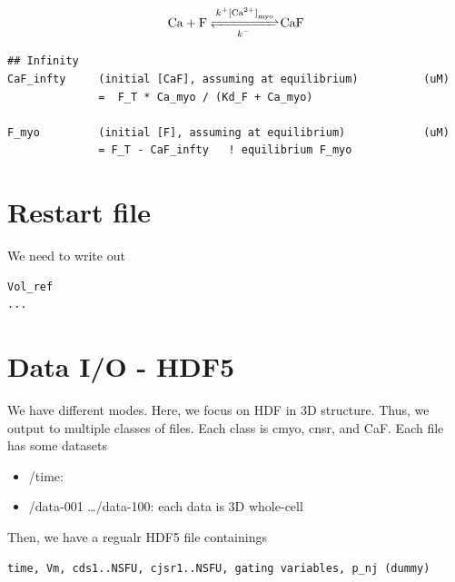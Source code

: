 \begin{equation}
  \label{eq:40}
  \cee{Ca + F <=>[k^+\text{[}\Ca\text{]}_\myo][k^-] CaF}
\end{equation}

\begin{verbatim}
## Infinity
CaF_infty     (initial [CaF], assuming at equilibrium)          (uM)
              =  F_T * Ca_myo / (Kd_F + Ca_myo)

F_myo         (initial [F], assuming at equilibrium)            (uM)
              = F_T - CaF_infty   ! equilibrium F_myo
\end{verbatim}



\section{Restart file}
\label{sec:spatial_restart-file}

We need to write out
\begin{verbatim}
Vol_ref
...
\end{verbatim}



\section{Data I/O - HDF5}
\label{sec:spatial_hdf5}

We have different modes. Here, we focus on HDF in 3D structure. Thus, we output
to multiple classes of files. Each class is cmyo, cnsr, and CaF. Each file has
some datasets
\begin{itemize}	
  \item /time: 
  \item /data-001 \ldots /data-100: each data is 3D whole-cell
\end{itemize}

Then, we have a regualr HDF5 file containings 
\begin{verbatim}
time, Vm, cds1..NSFU, cjsr1..NSFU, gating variables, p_nj (dummy)
\end{verbatim}


